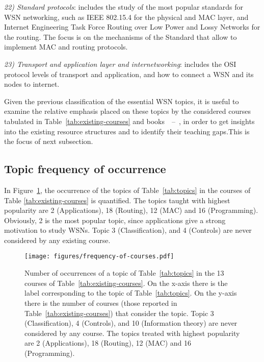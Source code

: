 \documentclass[onecolumn,12pt,draftclsnofoot,a4paper,peerreview]{IEEEtran}
\begin{document}
{\em 22) Standard protocols}: includes the study of the most popular standards for WSN networking, such as IEEE 802.15.4 for the physical and MAC layer, and Internet Engineering Task Force Routing over Low Power and Lossy Networks for the routing. The focus is on the mechanisms of the Standard that allow to implement MAC and routing protocols.  

{\em 23) Transport and application layer and internetworking}: includes the OSI protocol levels of transport and application, and how to connect a WSN and its nodes to internet. 

Given the previous classification of the essential WSN topics, it is useful to examine the relative emphasis placed on these topics by the considered courses tabulated in Table~\ref{tab:existing-courses} and books~\cite{ZhaoGuibas04}~--\nocite{KarlWillig05,PottieKaiser05,Swami07,Zurawski09,ShelbyBormann09,HykinLiu10,AkyildizVuran10,DargiePoellabauer10,Ferrari10,NikoletseasRolim10}~\cite{Mazumder11}, in order to get insights into the existing resource structures and to identify their teaching gaps.This is the focus of next subsection. 



\subsection{Topic frequency of occurrence}


In Figure~\ref{fig:frequency-course-topics}, the occurrence of the topics of Table~\ref{tab:topics} in the courses of Table \ref{tab:existing-courses} is quantified. 
The topics taught with highest popularity are 2 (Applications), 18 (Routing), 12 (MAC) and 16 (Programming). Obviously, 2 is the most popular topic, since applications give a strong motivation to study WSNs.  Topic 3 (Classification), and 4 (Controls) are never considered by any existing course. 

\begin{figure}[t]
\centering
\texttt{[image: figures/frequency-of-courses.pdf]}
\caption{Number of occurrences of a topic of Table~\ref{tab:topics} in the 13 courses of Table~\ref{tab:existing-courses}. On the x-axis there is the label corresponding to the topic of Table~\ref{tab:topics}. On the y-axis there is the number of courses (those reported in Table~\ref{tab:existing-courses}) that consider the topic. Topic 3 (Classification), 4 (Controls), and 10 (Information theory) are never considered by any course. The topics treated with highest popularity are 2 (Applications), 18 (Routing), 12 (MAC) and 16 (Programming).   }
\label{fig:frequency-course-topics}
\end{figure}
\end{document}
